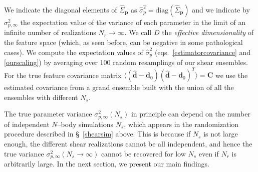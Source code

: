 \documentclass[reprint,aps,prd,superscriptaddress,showkeys,showpacs]{revtex4-1}
\newcommand{\bb}[1]{\mathbf{#1}}
\newcommand{\bbh}[1]{\mathbf{\hat{#1}}}
\newcommand{\h}[1]{\hat{#1}}
\begin{document}
%
We indicate the diagonal elements of $\h{\Sigma}_{\bb{p}}$ as
$\h{\sigma}^2_p=\mathrm{diag}(\h{\Sigma}_{\bb{p}})$ and we indicate by
$\sigma^2_{p,\infty}$ the expectation value of the variance of each
parameter in the limit of an infinite number of realizations
$N_r\rightarrow\infty$.  We call $D$ the \textit{effective
  dimensionality} of the feature space (which, as seen before, can be
negative in some pathological cases).  We compute the expectation
values of $\h{\sigma}^2_p$ (eqs.~\ref{estimatorcovariance} and
\ref{ourscaling}) by averaging over 100 random resamplings of our
shear ensembles. For the true feature covariance matrix
$\langle(\bbh{d}-\bb{d}_0)(\bbh{d}-\bb{d}_0)^T\rangle=\bb{C}$ we use
the estimated covariance from a grand ensemble built with the union of
all the ensembles with different $N_s$.

The true parameter variance $\sigma^2_{p,\infty}(N_s)$ in principle
can depend on the number of independent $N$--body simulations $N_s$,
which appears in the randomization procedure described in
\S~\ref{shearsim} above. This is because if $N_s$ is not large enough,
the different shear realizations cannot be all independent, and hence
the true variance $\sigma^2_{p,\infty}(N_s\rightarrow\infty)$ cannot
be recovered for low $N_s$ even if $N_r$ is arbitrarily large. In the
next section, we present our main findings.
 
\end{document}
